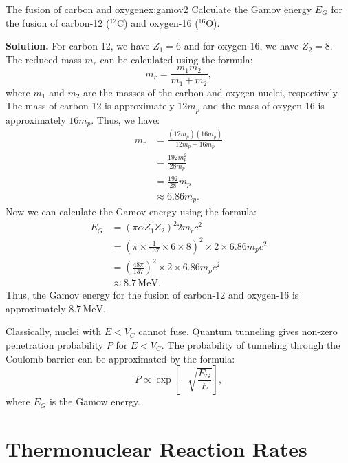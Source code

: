 \begin{example}{The fusion of carbon and oxygen}{ex:gamov2}
Calculate the Gamov energy $E_G$ for the fusion of carbon-12 ($^{12}\text{C}$) and oxygen-16 ($^{16}\text{O}$). 

\smallskip\textbf{Solution.}
For carbon-12, we have $Z_1 = 6$ and for oxygen-16, we have $Z_2 = 8$. The reduced mass $m_r$ can be calculated using the formula:
\begin{equation}
m_r = \frac{m_1 m_2}{m_1 + m_2},
\end{equation}
where $m_1$ and $m_2$ are the masses of the carbon and oxygen nuclei, respectively. The mass of carbon-12 is approximately $12 m_p$ and the mass of oxygen-16 is approximately $16 m_p$. Thus, we have:
\begin{align*}
m_r &= \frac{(12 m_p)(16 m_p)}{12 m_p + 16 m_p} \\
&= \frac{192 m_p^2}{28 m_p} \\        
&= \frac{192}{28} m_p \\
&\approx 6.86 m_p.
\end{align*}
Now we can calculate the Gamov energy using the formula:
\begin{align*}
E_G &= (\pi \alpha Z_1 Z_2)^2 2 m_{r}c^2 \\
&= (\pi \times \frac{1}{137} \times 6 \times 8)^2 \times 2 \times 6.86 m_p c^2 \\
&= \left(\frac{48\pi}{137}\right)^2 \times 2 \times 6.86 m_p c^2 \\
&\approx 8.7\,\text{MeV}. 
\end{align*}
Thus, the Gamov energy for the fusion of carbon-12 and oxygen-16 is approximately $8.7\,\text{MeV}$.
\end{example}


\begin{foundation}
Classically, nuclei with $E<V_C$ cannot fuse.
Quantum tunneling gives non-zero penetration probability $P$ for $E<V_C$. The probability of tunneling through the Coulomb barrier can be approximated by the formula:
\begin{equation}
    P \propto \exp\left[-\sqrt{\frac{E_G}{E}}\right],
\end{equation}
where $E_G$ is the Gamow energy.
\end{foundation}

\section{Thermonuclear Reaction Rates}

